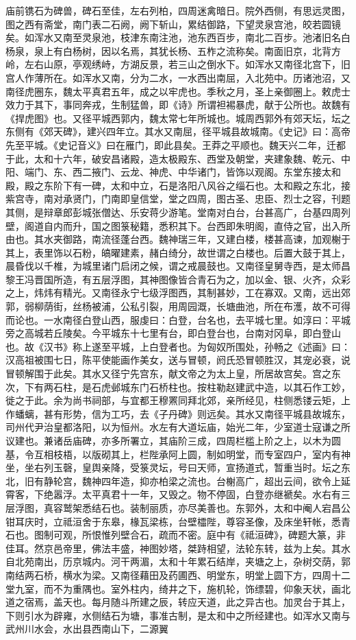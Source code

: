 \documentclass[12pt,UTF8]{ctexbook}
\begin{document}
庙前镌石为碑兽，碑石至佳，左右列柏，四周迷禽暗日。院外西侧，有思远灵图，图之西有斋堂，南门表二石阙，阙下斩山，累结御路，下望灵泉宫池，皎若圆镜矣。如浑水又南至灵泉池，枝津东南注池，池东西百步，南北二百步。池渚旧名白杨泉，泉上有白杨树，因以名焉，其犹长杨、五柞之流称矣。南面旧京，北背方岭，左右山原，亭观绣峙，方湖反景，若三山之倒水下。如浑水又南径北宫下，旧宫人作薄所在。如浑水又南，分为二水，一水西出南屈，入北苑中。历诸池沼，又南径虎圈东，魏太平真君五年，成之以牢虎也。季秋之月，圣上亲御圈上。敕虎士效力于其下，事同奔戎，生制猛兽，即《诗》所谓袒裼暴虎，献于公所也。故魏有《捍虎图》也。又径平城西郭内，魏太常七年所城也。城周西郭外有郊天坛，坛之东侧有《郊天碑》，建兴四年立。其水又南屈，径平城县故城南。《史记》曰：高帝先至平城。《史记音义》曰在雁门，即此县矣。王莽之平顺也。魏天兴二年，迁都于此，太和十六年，破安昌诸殿，造太极殿东、西堂及朝堂，夹建象魏、乾元、中阳、端门、东、西二掖门、云龙、神虎、中华诸门，皆饰以观阁。东堂东接太和殿，殿之东阶下有一碑，太和中立，石是洛阳八风谷之缁石也。太和殿之东北，接紫宫寺，南对承贤门，门南即皇信堂，堂之四周，图古圣、忠臣、烈士之容，刊题其侧，是辩章郎彭城张僧达、乐安蒋少游笔。堂南对白台，台甚高广，台基四周列壁，阁道自内而升，国之图箓秘籍，悉积其下。台西即朱明阁，直侍之官，出入所由也。其水夹御路，南流径蓬台西。魏神瑞三年，又建白楼，楼甚高谏，加观榭于其上，表里饰以石粉，皜曜建素，赭白绮分，故世谓之白楼也。后置大鼓于其上，晨昏伐以千椎，为城里诸门启闭之候，谓之戒晨鼓也。又南径皇舅寺西，是太师昌黎王冯晋国所造，有五层浮图，其神图像皆合青石为之，加以金、银、火齐，众彩之上，炜炜有精光。又南径永宁七级浮图西，其制甚妙，工在寡双。又南，远出郊郭，弱柳荫街，丝杨被浦，公私引裂，用周园溉，长塘曲池，所在布濩，故不可得而论也。一水南径白登山西，服虔曰：白登，台名也，去平城七里。如淳曰：平城旁之高城若丘陵矣。今平城东十七里有台，即白登台也，台南对冈阜，即白登山也。故《汉书》称上遂至平城，上白登者也。为匈奴所围处，孙畅之《述画》曰：汉高祖被围七日，陈平使能画作美女，送与冒顿，阏氏恐冒顿胜汉，其宠必衰，说冒顿解围于此矣。其水又径宁先宫东，献文帝之为太上皇，所居故宫矣。宫之东次，下有两石柱，是石虎邺城东门石桥柱也。按柱勒赵建武中造，以其石作工妙，徙之于此。余为尚书祠部，与宜都王穆罴同拜北郊，亲所经见，柱侧悉镂云矩，上作蟠螭，甚有形势，信为工巧，去《子丹碑》则远矣。其水又南径平城县故城东，司州代尹治皇都洛阳，以为恒州。水左有大道坛庙，始光二年，少室道士寇谦之所议建也。兼诸岳庙碑，亦多所署立，其庙阶三成，四周栏槛上阶之上，以木为圆基，令互相枝梧，以版砌其上，栏陛承阿上圆，制如明堂，而专室四户，室内有神坐，坐右列玉磬，皇舆亲降，受箓灵坛，号曰天师，宣扬道式，暂重当时。坛之东北，旧有静轮宫，魏神四年造，抑亦柏梁之流也。台榭高广，超出云间，欲令上延霄客，下绝嚣浮。太平真君十一年，又毁之。物不停固，白登亦继褫矣。水右有三层浮图，真容鹫架悉结石也。装制丽质，亦尽美善也。东郭外，太和中阉人宕昌公钳耳庆时，立祗洹舍于东皋，椽瓦梁栋，台壁櫺陛，尊容圣像，及床坐轩帐，悉青石也。图制可观，所恨惟列壁合石，疏而不密。庭中有《祗洹碑》，碑题大篆，非佳耳。然京邑帝里，佛法丰盛，神图妙塔，桀跱相望，法轮东转，兹为上矣。其水自北苑南出，历京城内。河干两湄，太和十年累石结岸，夹塘之上，杂树交荫，郭南结两石桥，横水为梁。又南径藉田及药圃西、明堂东，明堂上圆下方，四周十二堂九室，而不为重隅也。室外柱内，绮井之下，施机轮，饰缥碧，仰象天状，画北道之宿焉，盖天也。每月随斗所建之辰，转应天道，此之异古也。加灵台于其上，下则引水为辟雍，水侧结石为塘，事准古制，是太和中之所经建也。如浑水又南与武州川水会，水出县西南山下，二源翼
\end{document}
